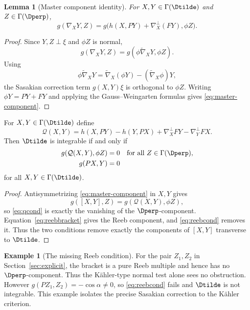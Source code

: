\documentclass[11pt]{article}
\newtheorem{lemma}[theorem]{Lemma}\newtheorem{corollary}[theorem]{Corollary}
\theoremstyle{definition}\newtheorem{definition}[theorem]{Definition}\newtheorem{example}[theorem]{Example}
\theoremstyle{remark}\newtheorem{remark}[theorem]{Remark}
\begin{document}
\begin{lemma}[Master component identity]\label{lem:master-component}
For \(X,Y\in\Gamma(\Dtilde)\) and \(Z\in\Gamma(\Dperp)\),
\begin{equation}\label{eq:master-component}
g(\nabla_XY,Z)
=
g\bigl(h(X,PY)+\nabla_X^\perp(FY),\phi Z\bigr).
\end{equation}
\end{lemma}

\begin{proof}
Since \(Y,Z\perp\xi\) and \(\phi Z\) is normal,
\[
g(\nabla_XY,Z)=g(\phi\widetilde\nabla_XY,\phi Z).
\]
Using
\[
\phi\widetilde\nabla_XY
=\widetilde\nabla_X(\phi Y)-(\widetilde\nabla_X\phi)Y,
\]
the Sasakian correction term \(g(X,Y)\xi\) is orthogonal to \(\phi Z\).
Writing \(\phi Y=PY+FY\) and applying the Gauss--Weingarten formulas gives
\eqref{eq:master-component}.
\end{proof}

\begin{proposition}\label{prop:ambcrit}
For $X,Y\in\Gamma(\Dtilde)$ define
\[
 \mathcal Q(X,Y)=h(X,PY)-h(Y,PX)+\nabla_X^\perp FY-\nabla_Y^\perp FX.
\]
Then $\Dtilde$ is integrable if and only if
\begin{align}
 g(\mathcal Q(X,Y),\phi Z)&=0 \quad\text{for all }Z\in\Gamma(\Dperp),\label{eq:qcond}\\
 g(PX,Y)&=0\label{eq:reebcond}
\end{align}
for all $X,Y\in\Gamma(\Dtilde)$.
\end{proposition}
\begin{proof}
Antisymmetrizing \eqref{eq:master-component} in \(X,Y\) gives
\[
g([X,Y],Z)=g(\mathcal Q(X,Y),\phi Z),
\]
so \eqref{eq:qcond} is exactly the vanishing of the
\(\Dperp\)-component.  Equation~\eqref{eq:reebbracket} gives the Reeb
component, and \eqref{eq:reebcond} removes it.  Thus the two conditions
remove exactly the components of \([X,Y]\) transverse to \(\Dtilde\).
\end{proof}

\begin{example}[The missing Reeb condition]\label{ex:ambcrit}
For the pair $Z_1,Z_2$ in Section~\ref{sec:explicit}, the bracket is a pure Reeb multiple and hence has no $\Dperp$-component. Thus the K\"ahler-type normal test alone sees no obstruction. However
$g(PZ_1,Z_2)=-\cos\alpha\ne0$, so \eqref{eq:reebcond} fails and $\Dtilde$ is not integrable. This example isolates the precise Sasakian correction to the K\"ahler criterion.
\end{example}
\end{document}

